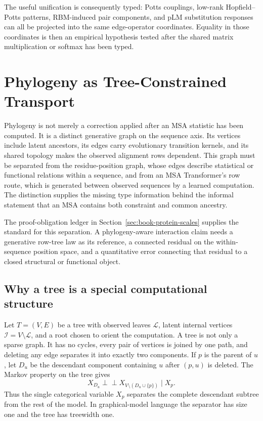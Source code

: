 \documentclass[10pt]{article}
\theoremstyle{definition}
\theoremstyle{remark}
\newcommand{\BookChapter}[1]{\section{#1}}
\newcommand{\BookInsert}[1]{}
\newcommand{\BookChapterLabel}[1]{}
\newcommand{\BookSection}[1]{\subsection{#1}}
\begin{document}
The useful unification is consequently typed: Potts couplings, low-rank Hopfield--Potts patterns,
RBM-induced pair components, and pLM substitution responses can all be projected into the same
edge-operator coordinates.  Equality in those coordinates is then an empirical hypothesis tested
after the shared matrix multiplication or softmax has been typed.

\BookInsert{chapters/07_unified_framework_case}
\BookInsert{chapters/07_gcn_longitudinal}

\BookInsert{chapters/07_coda}
\BookChapter{Phylogeny as Tree-Constrained Transport}
\BookChapterLabel{chap:book-phylogeny}

Phylogeny is not merely a correction applied after an MSA statistic has been computed.  It is a
distinct generative graph on the sequence axis.  Its vertices include latent ancestors, its edges
carry evolutionary transition kernels, and its shared topology makes the observed alignment rows
dependent.  This graph must be separated from the residue-position graph, whose edges describe
statistical or functional relations within a sequence, and from an MSA Transformer's row route,
which is generated between observed sequences by a learned computation.  The distinction supplies
the missing type information behind the informal statement that an MSA contains both constraint
and common ancestry.

\ifdefined\BOOKMODE
The proof-obligation ledger in Section~\ref{sec:book-protein-scales} supplies the standard for this
separation.
\fi
A phylogeny-aware interaction claim needs a generative row-tree law as its reference,
a connected residual on the within-sequence position space, and a quantitative error connecting
that residual to a closed structural or functional object.

\BookInsert{chapters/08_phylogeny_toy_tree}

\BookSection{Why a tree is a special computational structure}

Let $T=(V,E)$ be a tree with observed leaves $\mathcal L$, latent internal vertices
$\mathcal I=V\setminus\mathcal L$, and a root chosen to orient the computation.  A tree is not only
a sparse graph.  It has no cycles, every pair of vertices is joined by one path, and deleting any
edge separates it into exactly two components.  If $p$ is the parent of $u$, let $D_u$ be the
descendant component containing $u$ after $(p,u)$ is deleted.  The Markov property on the tree gives
\begin{equation}
X_{D_u}
\mathrel{\perp\!\!\!\perp}
X_{V\setminus(D_u\cup\{p\})}
\mid X_p .
\label{eq:tree-separator-independence}
\end{equation}
Thus the single categorical variable $X_p$ separates the complete descendant subtree from the
rest of the model.  In graphical-model language the separator has size one and the tree has
treewidth one.
\end{document}
